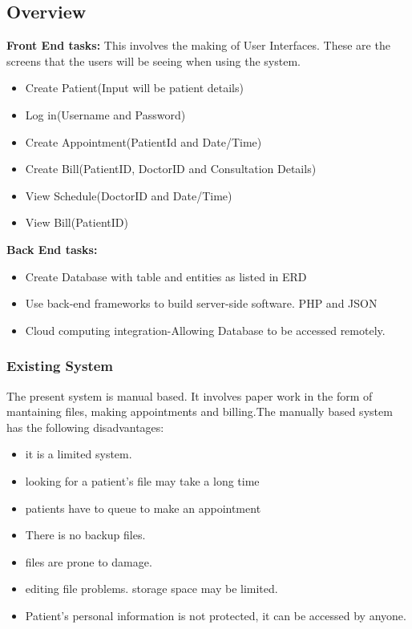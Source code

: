 \documentclass[11 pt]{article}
\begin{document}
\subsection{Overview}
\textbf{Front End tasks:}
    This involves the making of User Interfaces. These are the screens that the users will be seeing when using the system.
    \begin{itemize}
    \item
    Create Patient(Input will be patient details)
    \item
    Log in(Username and Password)
    \item
    Create Appointment(PatientId and Date/Time)
    \item
    Create Bill(PatientID, DoctorID and Consultation Details)
    \item
    View Schedule(DoctorID and Date/Time)
    \item
    View Bill(PatientID)
    \end{itemize}
    \textbf{Back End tasks:}
    \begin{itemize}
    \item
    Create Database with table and entities as listed in ERD
    \item
    Use back-end frameworks to build server-side software. PHP and JSON    
    \item
    Cloud computing integration-Allowing Database to be accessed remotely.
    \end{itemize}

\subsubsection{Existing System}
The present system is manual based. It involves paper work in the form of mantaining files, making appointments and billing.The manually based system has the following disadvantages:
\begin{itemize}
\item
it is a limited system.
\item
looking for a patient's file may take a long time
\item
patients have to queue to make an appointment
\item
There is no backup files.
\item
files are prone to damage.
\item
editing file problems.
storage space may be limited.
\item
Patient's personal information is not protected, it can be accessed by anyone.
\end{itemize}
\end{document}
